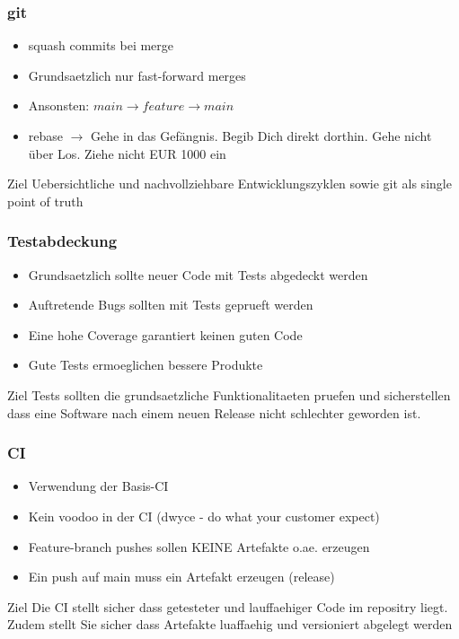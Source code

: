 \begin{frame}
    \frametitle{git}
    \begin{itemize}
    \item squash commits bei merge
    \item Grundsaetzlich nur fast-forward merges
    \item Ansonsten: $ main  \rightarrow feature \rightarrow main $
    \item rebase $\rightarrow$ Gehe in das Gefängnis. Begib Dich direkt dorthin. Gehe nicht über Los. Ziehe nicht EUR 1000 ein 
    \end{itemize}
    \begin{block}{Ziel}
      Uebersichtliche und nachvollziehbare Entwicklungszyklen sowie git als single point of truth
      \end{block}
\end{frame}

\begin{frame}
    \frametitle{Testabdeckung}
    \begin{itemize}
    \item Grundsaetzlich sollte neuer Code mit Tests abgedeckt werden
    \item Auftretende Bugs sollten mit Tests geprueft werden
    \item Eine hohe Coverage garantiert keinen guten Code
    \item Gute Tests ermoeglichen bessere Produkte
    \end{itemize}
    \begin{block}{Ziel}
        Tests sollten die grundsaetzliche Funktionalitaeten pruefen und sicherstellen dass eine Software nach einem neuen Release nicht schlechter geworden ist.
    \end{block}
\end{frame}


\begin{frame}
    \frametitle{CI}
    \begin{itemize}
      \item Verwendung der Basis-CI
      \item Kein voodoo in der CI (dwyce - do what your customer expect)
      \item Feature-branch pushes sollen KEINE Artefakte o.ae. erzeugen
      \item Ein push auf main muss ein Artefakt erzeugen (release)
    \end{itemize}
    \begin{block}{Ziel}
        Die CI stellt sicher dass getesteter und lauffaehiger Code im repositry liegt. Zudem stellt Sie sicher dass Artefakte luaffaehig und versioniert abgelegt werden
    \end{block}
\end{frame}

